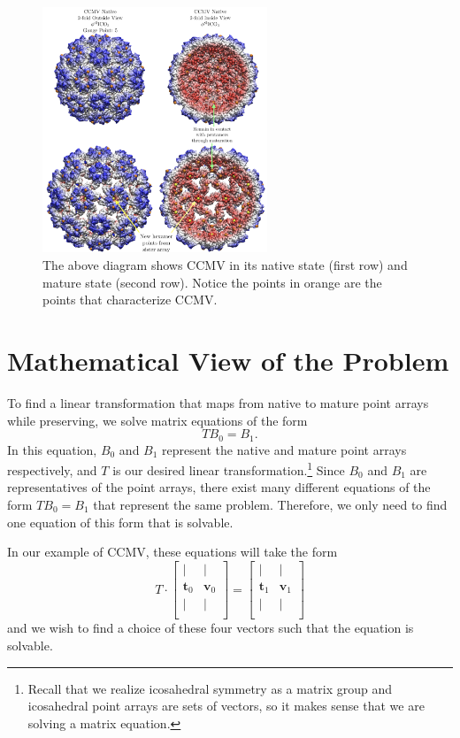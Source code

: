 \documentclass[a4paper,10pt]{article}
\theoremstyle{plain}
\theoremstyle{definition}
\theoremstyle{remark}
\renewcommand{\vec}[1]{\textbf{#1}}
\begin{document}
\begin{figure}[!h]
	\centering
	\captionsetup{width=0.5\textwidth}
	\includegraphics[width=0.6\textwidth]{images/CCMV_maturation.png}
	\caption{The above diagram shows CCMV in its native state (first row) and mature state (second row). Notice the points in orange are the points that characterize CCMV.}
	\label{fig:CCMV_maturation}
\end{figure}

\section{Mathematical View of the Problem}
To find a linear transformation that maps from native to mature point arrays while preserving, we solve matrix equations of the form \[TB_0 = B_1.\]
In this equation, \(B_0\) and \(B_1\) represent the native and mature point arrays respectively, and \(T\) is our desired linear transformation.\footnote{Recall that we realize icosahedral symmetry as a matrix group and icosahedral point arrays are sets of vectors, so it makes sense that we are solving a matrix equation.}
Since \(B_0\) and \(B_1\) are representatives of the point arrays, there exist many different equations of the form \(TB_0 = B_1\) that represent the same problem.
Therefore, we only need to find one equation of this form that is solvable.

In our example of CCMV, these equations will take the form \[T\cdot \begin{bmatrix}
    | & | \\
    \vec{t}_0 & \vec{v}_0 \\
    | & | \\
\end{bmatrix} = \begin{bmatrix}
    | & | \\
    \vec{t}_1 & \vec{v}_1 \\
    | & | \\
\end{bmatrix}\]
and we wish to find a choice of these four vectors such that the equation is solvable.
\end{document}
